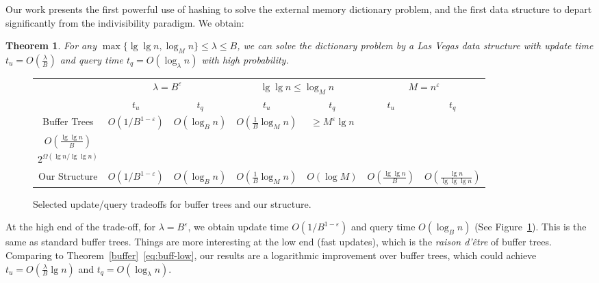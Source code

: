 \documentclass[letterpaper,11pt]{article}
\newtheorem{theorem}{Theorem}
\newcommand{\eps}{\varepsilon}
\begin{document}
Our work presents the first powerful use of hashing to solve the
external memory dictionary problem, and the first data structure to
depart significantly from the indivisibility paradigm. We obtain:

\begin{theorem}
For any $\max \{ \lg\lg n, \log_M n \} \le \lambda \le B$, we can
solve the dictionary problem by a Las Vegas data structure with update
time $t_u = O(\frac{\lambda}{B})$ and query time $t_q = O(\log_\lambda
n)$ with high probability.
\end{theorem}

\begin{figure}
\begin{tabular}{c|cc|cc|cc|}
&\multicolumn{2}{c|}{$\lambda=B^\eps$}
& \multicolumn{2}{c|}{$\lg \lg n \leq \log_M n$}
& \multicolumn{2}{c|}{$M=n^\eps$}\\
& $t_u$ & $t_q$
& $t_u$ & $t_q$
& $t_u$ & $t_q$
\\ \hline
Buffer Trees &  
$O(1/B^{1-\eps})$ & $O(\log_Bn)$ &
 $O(\frac{1}{B}\log_M n)$ & $\geq M^\eps \lg n$
&\parbox[c]{0.6in}{\begin{center}$O(\frac{\lg  n}{B})$\\$O(\frac{\lg \lg n}{B})$\end{center}}& 
\parbox[c]{0.8in}{\begin{center}$O(\lg n)$\\$2^{\Omega(\lg n/\lg \lg n)}$\end{center}}\\
Our Structure 
& $O(1/B^{1-\eps})$ & $O(\log_Bn)$ 
& $O(\frac{1}{B}\log_M n)$ & $O(\log M)$
& $O(\frac{\lg \lg n}{B})$ & $O(\frac{\lg n}{\lg \lg \lg n})$ \\
\end{tabular}

\caption{Selected update/query tradeoffs for buffer trees and our structure.}\label{tradeoffs}
\end{figure}

At the high end of the trade-off, for $\lambda = B^\eps$, we obtain
update time $O(1/B^{1-\eps})$ and query time $O(\log_B n)$ (See
Figure~\ref{tradeoffs}). This is the same as standard buffer trees.
Things are more interesting at the low end (fast updates), which is
the \emph{raison d'\^{e}tre} of buffer trees. Comparing to
Theorem~\ref{buffer}~\eqref{eq:buff-low}, our results are a
logarithmic improvement over buffer trees, which could achieve $t_u =
O(\tfrac{\lambda}{B} \lg n)$ and $t_q = O(\log_\lambda n)$.
\end{document}
